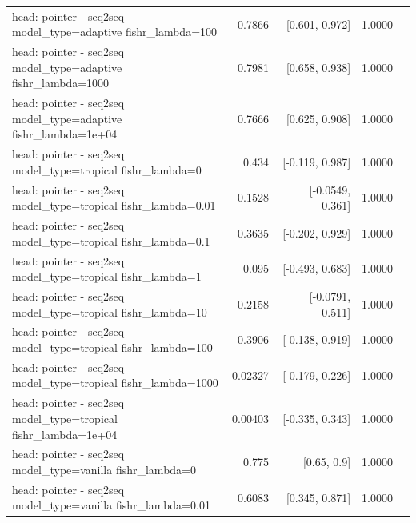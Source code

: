 \documentclass[10pt]{article}
\makeatletter
\newcommand{\stackcell}[1]{\begin{tabular}[t]{@{}l@{}}#1\end{tabular}}
\makeatother
\begin{document}
{\begin{longtable}{lrrrl}
\stackcell{head: pointer - seq2seq\\\footnotesize model\_type=adaptive fishr\_lambda=100 } & 0.7866 & [0.601, 0.972] & 1.0000 & \\
\stackcell{head: pointer - seq2seq\\\footnotesize model\_type=adaptive fishr\_lambda=1000 } & 0.7981 & [0.658, 0.938] & 1.0000 & \\
\stackcell{head: pointer - seq2seq\\\footnotesize model\_type=adaptive fishr\_lambda=1e+04 } & 0.7666 & [0.625, 0.908] & 1.0000 & \\
\stackcell{head: pointer - seq2seq\\\footnotesize model\_type=tropical fishr\_lambda=0 } & 0.434 & [-0.119, 0.987] & 1.0000 & \\
\stackcell{head: pointer - seq2seq\\\footnotesize model\_type=tropical fishr\_lambda=0.01 } & 0.1528 & [-0.0549, 0.361] & 1.0000 & \\
\stackcell{head: pointer - seq2seq\\\footnotesize model\_type=tropical fishr\_lambda=0.1 } & 0.3635 & [-0.202, 0.929] & 1.0000 & \\
\stackcell{head: pointer - seq2seq\\\footnotesize model\_type=tropical fishr\_lambda=1 } & 0.095 & [-0.493, 0.683] & 1.0000 & \\
\stackcell{head: pointer - seq2seq\\\footnotesize model\_type=tropical fishr\_lambda=10 } & 0.2158 & [-0.0791, 0.511] & 1.0000 & \\
\stackcell{head: pointer - seq2seq\\\footnotesize model\_type=tropical fishr\_lambda=100 } & 0.3906 & [-0.138, 0.919] & 1.0000 & \\
\stackcell{head: pointer - seq2seq\\\footnotesize model\_type=tropical fishr\_lambda=1000 } & 0.02327 & [-0.179, 0.226] & 1.0000 & \\
\stackcell{head: pointer - seq2seq\\\footnotesize model\_type=tropical fishr\_lambda=1e+04 } & 0.00403 & [-0.335, 0.343] & 1.0000 & \\
\stackcell{head: pointer - seq2seq\\\footnotesize model\_type=vanilla fishr\_lambda=0 } & 0.775 & [0.65, 0.9] & 1.0000 & \\
\stackcell{head: pointer - seq2seq\\\footnotesize model\_type=vanilla fishr\_lambda=0.01 } & 0.6083 & [0.345, 0.871] & 1.0000 & \\

\end{longtable}}
\end{document}
